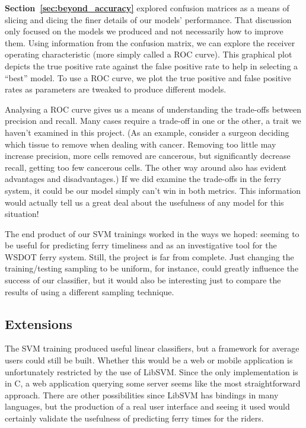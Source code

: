 \documentclass[11pt]{article} %
\begin{document}
\textbf{Section~\ref{sec:beyond_accuracy}} explored confusion matrices as a 
means of slicing and dicing the finer details of our models' performance. That
discussion only focused on the models we produced and not necessarily how to
improve them. Using information from the confusion matrix, we can explore the
receiver operating characteristic (more simply called a ROC curve). This 
graphical plot depicts the true positive rate against the false positive rate
to help in selecting a ``best'' model. To use a ROC curve, we plot the true
positive and false positive rates as parameters are tweaked to produce different
models. 

Analysing a ROC curve gives us a means of understanding the trade-offs between
precision and recall. 
Many cases require a trade-off in one or the other, a 
trait we haven't examined in this project. (As an example, consider a 
surgeon deciding which tissue to remove when dealing with cancer. Removing too
little may increase precision, more cells removed are cancerous, but significantly
decrease recall, getting too few cancerous cells. The other way around also has
evident advantages and disadvantages.) If we did examine the trade-offs in the
ferry system, it could be our model simply can't win in both metrics. This 
information would actually tell us a great deal about the usefulness of any
model for this situation!

The end product of our SVM trainings worked in the ways we hoped: seeming to be 
useful for predicting ferry timeliness and as an investigative tool for the
WSDOT ferry system. Still, the project is far from complete. Just changing the
training/testing sampling to be uniform, for instance, could greatly influence
the success of our classifier, but it would also be interesting just to compare
the results of using a different sampling technique.

\subsection{Extensions}
\label{sec:extensions}
The SVM training produced useful linear classifiers, but a framework for average
users could still be built. Whether this would be a web or mobile application is
unfortunately restricted by the use of LibSVM. Since the only implementation is in 
C, a web application querying some server seems like the most straightforward
approach. There are other possibilities since LibSVM has bindings in many languages,
but the production of a real user interface and seeing it used would certainly 
validate the usefulness of predicting ferry times for the riders.
\end{document}
